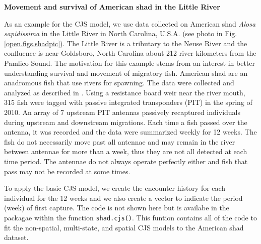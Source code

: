{\flushleft \bf Movement and survival of American shad in the Little River}

As an example for the CJS model, we use data collected on American
shad \textit{Alosa sapidissima} in the Little River in North Carolina,
U.S.A. (see photo in Fig. \ref{open.figs.shadpic}).  The Little River
is a tributary to the Neuse River and the confluence is near
Goldsboro, North Carolina about 212 river kilometers from the Pamlico
Sound.  The motivation for this example stems from an interest in
better understanding survival and movement of migratory fish.
American shad are an anadromous fish that use rivers for spawning.
The data were collected and analyzed as described in
\citet{raabe_diss:2012}.  Using a resistance board weir near the river
mouth, 315 fish were tagged with passive integrated transponders (PIT)
in the spring of 2010. An array of 7 upstream PIT antennas passively
recaptured individuals during upstream and downstream migrations.
Each time a fish passed over the antenna, it was recorded and the data
were summarized weekly for 12 weeks.  The fish do not necessarily move
past all antennae and may remain in the river between antennae for
more than a week, thus they are not all detected at each time period.
The antennae do not always operate perfectly either and fish that pass
may not be recorded at some times.

To apply the basic CJS model, we create the encounter history for each
individual for the 12 weeks and we also create a vector to indicate
the period (week) of first capture. The code is not shown here but is
availabe in the \scrbook~ packagae within the function
\verb+shad.cjs()+.  This funtion contains all of the code to fit the
non-spatial, multi-state, and spatial CJS models to the American shad
dataset.


